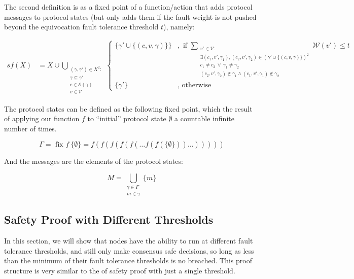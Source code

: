 The second definition is as a fixed point of a function/action that adds protocol messages to protocol states (but only adds them if the fault weight is not pushed beyond the equivocation fault tolerance threshold $t$), namely:

\begin{align}s
f(X) &= X \cup \bigcup_{\substack{(\gamma, \gamma') \in X^2 : \\ \gamma \subseteq \gamma' \\ c \in \mathcal{E}(\gamma) \\ v \in \mathcal{V}}}
\begin{cases}
      \{\gamma' \cup \{(c, v, \gamma)\} \} &, \text{ if } \sum_{ \substack{v' \in \mathcal{V} : \\ \exists (c_1 , v', \gamma_1), (c_2 , v', \gamma_2) \in (\gamma' \cup \{(c, v, \gamma)\})^2 \\ c_1 \neq c_2 ~ \lor ~ \gamma_1 \neq \gamma_2 \\  (c_2 , v', \gamma_2) \notin \gamma_1  \land (c_1 , v', \gamma_1) \notin \gamma_2}} \mathcal{W}(v') \leq t \\
      \{\gamma'\} &, \text{ otherwise }
\end{cases}
\end{align}

The protocol states can be defined as the following fixed point, which the result of applying our function $f$ to ``initial'' protocol state $\emptyset$ a countable infinite number of times.

\[
\Gamma = \text{ fix } f ~ \{\emptyset\} = f(f(f(f(f(\dots f(f(\{\emptyset\}))\dots)))))
\]

And the messages are the elements of the protocol states:

\[
M = \bigcup_{\substack{\gamma \in \Gamma \\ m \in \gamma}} \{m\}
\]



\pagebreak
\subsection{Safety Proof with Different Thresholds}

In this section, we will show that nodes have the ability to run at different fault tolerance thresholds, and still only make consensus safe decisions, so long as less than the minimum of their fault tolerance thresholds is no breached. This proof structure is very similar to the of safety proof with just a single threshold.

